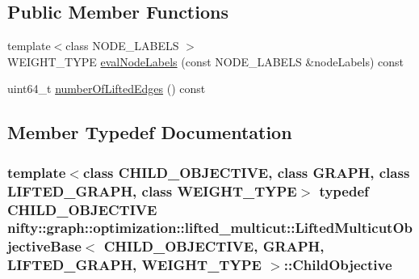 \subsection*{Public Member Functions}
\begin{DoxyCompactItemize}
\item 
{\footnotesize template$<$class N\+O\+D\+E\+\_\+\+L\+A\+B\+E\+L\+S $>$ }\\W\+E\+I\+G\+H\+T\+\_\+\+T\+Y\+P\+E \hyperlink{classnifty_1_1graph_1_1optimization_1_1lifted__multicut_1_1LiftedMulticutObjectiveBase_a249168f5d345535e4d49abb775b5f4ee}{eval\+Node\+Labels} (const N\+O\+D\+E\+\_\+\+L\+A\+B\+E\+L\+S \&node\+Labels) const 
\item 
uint64\+\_\+t \hyperlink{classnifty_1_1graph_1_1optimization_1_1lifted__multicut_1_1LiftedMulticutObjectiveBase_a7e21eec733ea9118f1ccafa88149ef76}{number\+Of\+Lifted\+Edges} () const 
\end{DoxyCompactItemize}


\subsection{Member Typedef Documentation}
\hypertarget{classnifty_1_1graph_1_1optimization_1_1lifted__multicut_1_1LiftedMulticutObjectiveBase_a51016bc6ef6d544846dd8e201f27c132}{}
\subsubsection[{Child\+Objective}]{\setlength{\rightskip}{0pt plus 5cm}template$<$class C\+H\+I\+L\+D\+\_\+\+O\+B\+J\+E\+C\+T\+I\+V\+E, class G\+R\+A\+P\+H, class L\+I\+F\+T\+E\+D\+\_\+\+G\+R\+A\+P\+H, class W\+E\+I\+G\+H\+T\+\_\+\+T\+Y\+P\+E$>$ typedef C\+H\+I\+L\+D\+\_\+\+O\+B\+J\+E\+C\+T\+I\+V\+E {\bf nifty\+::graph\+::optimization\+::lifted\+\_\+multicut\+::\+Lifted\+Multicut\+Objective\+Base}$<$ C\+H\+I\+L\+D\+\_\+\+O\+B\+J\+E\+C\+T\+I\+V\+E, G\+R\+A\+P\+H, L\+I\+F\+T\+E\+D\+\_\+\+G\+R\+A\+P\+H, W\+E\+I\+G\+H\+T\+\_\+\+T\+Y\+P\+E $>$\+::{\bf Child\+Objective}}\label{classnifty_1_1graph_1_1optimization_1_1lifted__multicut_1_1LiftedMulticutObjectiveBase_a51016bc6ef6d544846dd8e201f27c132}
\hypertarget{classnifty_1_1graph_1_1optimization_1_1lifted__multicut_1_1LiftedMulticutObjectiveBase_a103f0e557ebe2c8f86c07ee1a7aeeb5b}{}
